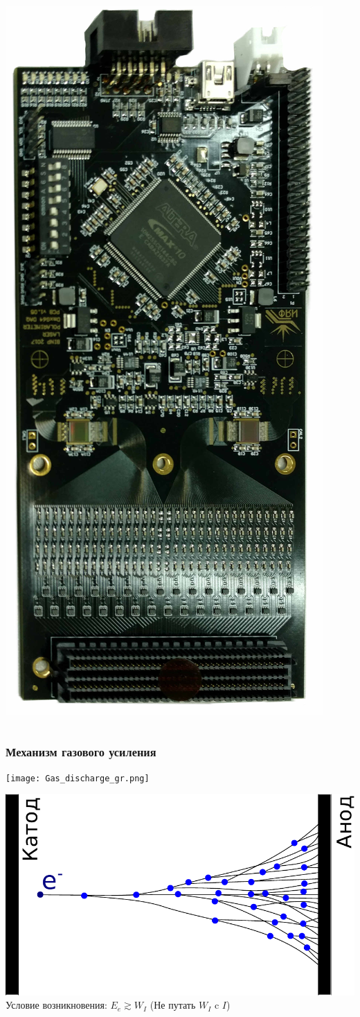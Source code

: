 \documentclass[14pt]{beamer}
\begin{document}
\begin{frame}[c]
\begin{columns}
\begin{minipage}[t][1\textheight]{\linewidth}
		\centering \includegraphics[width=0.5\linewidth]{Readout_board.jpg}
	\end{minipage}
\end{columns}
\end{frame}

\begin{frame}
\frametitle{Механизм газового усиления}
\begin{minipage}[h]{0.49\linewidth}
	\texttt{[image: Gas\_discharge\_gr.png]}
\end{minipage}
\begin{minipage}[h]{0.49\linewidth}
	\includegraphics[width=1\linewidth]{Electron_avalanche.pdf}
	\newline
	\newline \footnotesize{Условие возникновения: $E_e \gtrsim W_I$}
	\newline (Не путать $W_I$ c $I$)
\end{minipage}
\end{frame}
\end{document}
